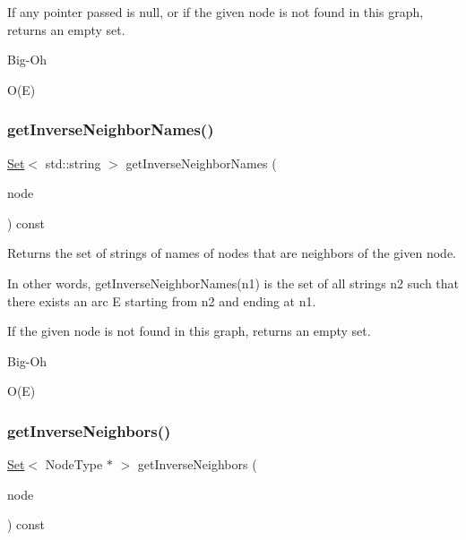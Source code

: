 If any pointer passed is null, or if the given node is not found in this graph, returns an empty set. \begin{DoxyRefDesc}{Big-\/\+Oh}
\item[\mbox{\hyperlink{BigOh__BigOh000067}{Big-\/\+Oh}}]O(\+E) \end{DoxyRefDesc}
\mbox{\label{classGraph_ac3dc36bc1eb0f249180cfe78bce6e7a2}} 
\subsubsection{\texorpdfstring{get\+Inverse\+Neighbor\+Names()}{getInverseNeighborNames()}\hspace{0.1cm}{\footnotesize\ttfamily [2/2]}}
{\footnotesize\ttfamily \mbox{\hyperlink{classstanfordcpplib_1_1collections_1_1GenericSet}{Set}}$<$ std\+::string $>$ get\+Inverse\+Neighbor\+Names (\begin{DoxyParamCaption}\item[{const std\+::string \&}]{node }\end{DoxyParamCaption}) const}



Returns the set of strings of names of nodes that are neighbors of the given node. 

In other words, get\+Inverse\+Neighbor\+Names(n1) is the set of all strings n2 such that there exists an arc E starting from n2 and ending at n1.

If the given node is not found in this graph, returns an empty set. \begin{DoxyRefDesc}{Big-\/\+Oh}
\item[\mbox{\hyperlink{BigOh__BigOh000068}{Big-\/\+Oh}}]O(\+E) \end{DoxyRefDesc}
\mbox{\label{classGraph_a80a5724c594b9bd0b6008c57b09af317}} 
\subsubsection{\texorpdfstring{get\+Inverse\+Neighbors()}{getInverseNeighbors()}\hspace{0.1cm}{\footnotesize\ttfamily [1/2]}}
{\footnotesize\ttfamily \mbox{\hyperlink{classstanfordcpplib_1_1collections_1_1GenericSet}{Set}}$<$ Node\+Type $\ast$ $>$ get\+Inverse\+Neighbors (\begin{DoxyParamCaption}\item[{Node\+Type $\ast$}]{node }\end{DoxyParamCaption}) const}



